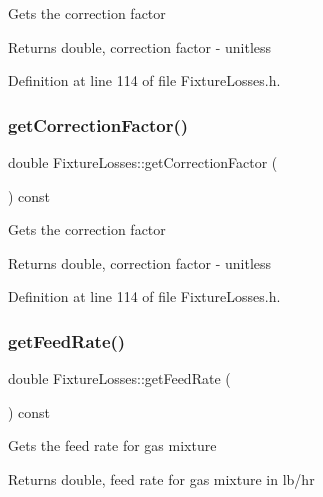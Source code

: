 Gets the correction factor \begin{DoxyReturn}{Returns}
double, correction factor -\/ unitless 
\end{DoxyReturn}


Definition at line 114 of file Fixture\+Losses.\+h.

\mbox{\label{class_fixture_losses_af643d715a8b1369efa586fa43e75c732}} 
\subsubsection{\texorpdfstring{get\+Correction\+Factor()}{getCorrectionFactor()}\hspace{0.1cm}{\footnotesize\ttfamily [3/3]}}
{\footnotesize\ttfamily double Fixture\+Losses\+::get\+Correction\+Factor (\begin{DoxyParamCaption}{ }\end{DoxyParamCaption}) const\hspace{0.3cm}{\ttfamily [inline]}}

Gets the correction factor \begin{DoxyReturn}{Returns}
double, correction factor -\/ unitless 
\end{DoxyReturn}


Definition at line 114 of file Fixture\+Losses.\+h.

\mbox{\label{class_fixture_losses_a09707af8de4b304c65f4aeb1130ea44e}} 
\subsubsection{\texorpdfstring{get\+Feed\+Rate()}{getFeedRate()}\hspace{0.1cm}{\footnotesize\ttfamily [1/3]}}
{\footnotesize\ttfamily double Fixture\+Losses\+::get\+Feed\+Rate (\begin{DoxyParamCaption}{ }\end{DoxyParamCaption}) const\hspace{0.3cm}{\ttfamily [inline]}}

Gets the feed rate for gas mixture \begin{DoxyReturn}{Returns}
double, feed rate for gas mixture in lb/hr 
\end{DoxyReturn}


